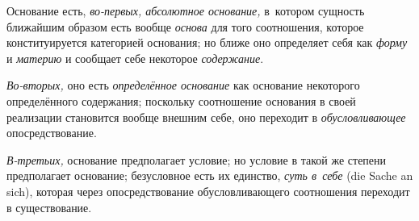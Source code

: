 Основание есть, {\em во-первых, абсолютное основание,} в~котором сущность
ближайшим образом есть вообще {\em основа} для того соотношения, которое
конституируется категорией основания; но ближе оно определяет себя как
{\em форму} и {\em материю} и сообщает себе некоторое {\em содержание}.

{\em Во-вторых,} оно есть {\em определённое основание} как основание некоторого
определённого содержания; поскольку соотношение основания в своей реализации
становится вообще внешним себе, оно переходит в {\em обусловливающее}
опосредствование.

{\em В-третьих,} основание предполагает условие; но условие в такой же степени
предполагает основание; безусловное есть их единство, {\em суть в~себе}
(die Sache an sich), которая через опосредствование обусловливающего
соотношения переходит в существование.


